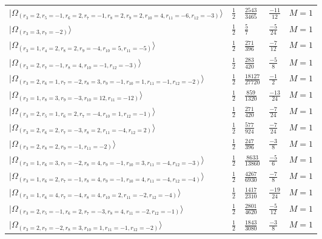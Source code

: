 \documentclass[11pt,twoside,openright]{book}
\begin{document}
\begin{longtable}{p{4cm}llll}
$|\Omega_{(r_{3}=2, r_{5}=-1, r_{6}=2, r_{7}=-1, r_{8}=2, r_{9}=2, r_{10}=4, r_{11}=-6, r_{12}=-3)}\rangle$ & $\frac{1}{2}$ & $\frac{2543}{3465}$ & $\frac{-11}{12}$ & $M=1$ \\
$|\Omega_{(r_{3}=3, r_{7}=-2)}\rangle$ & $\frac{1}{2}$ & $\frac{5}{7}$ & $\frac{-5}{24}$ & $M=1$ \\
$|\Omega_{(r_{3}=1, r_{4}=2, r_{8}=2, r_{9}=-4, r_{10}=5, r_{11}=-5)}\rangle$ & $\frac{1}{2}$ & $\frac{271}{396}$ & $\frac{-7}{12}$ & $M=1$ \\
$|\Omega_{(r_{3}=2, r_{7}=-1, r_{8}=4, r_{10}=-1, r_{12}=-3)}\rangle$ & $\frac{1}{2}$ & $\frac{283}{420}$ & $\frac{-5}{8}$ & $M=1$ \\
$|\Omega_{(r_{3}=2, r_{6}=1, r_{7}=-2, r_{8}=3, r_{9}=-1, r_{10}=1, r_{11}=-1, r_{12}=-2)}\rangle$ & $\frac{1}{2}$ & $\frac{18127}{27720}$ & $\frac{-1}{2}$ & $M=1$ \\
$|\Omega_{(r_{2}=1, r_{8}=3, r_{9}=-3, r_{10}=12, r_{11}=-12)}\rangle$ & $\frac{1}{2}$ & $\frac{859}{1320}$ & $\frac{-13}{24}$ & $M=1$ \\
$|\Omega_{(r_{3}=2, r_{5}=1, r_{6}=2, r_{7}=-4, r_{10}=1, r_{12}=-1)}\rangle$ & $\frac{1}{2}$ & $\frac{271}{420}$ & $\frac{-7}{24}$ & $M=1$ \\
$|\Omega_{(r_{3}=2, r_{6}=2, r_{7}=-3, r_{8}=2, r_{11}=-4, r_{12}=2)}\rangle$ & $\frac{1}{2}$ & $\frac{577}{924}$ & $\frac{-7}{24}$ & $M=1$ \\
$|\Omega_{(r_{3}=2, r_{8}=2, r_{9}=-1, r_{11}=-2)}\rangle$ & $\frac{1}{2}$ & $\frac{247}{396}$ & $\frac{-3}{8}$ & $M=1$ \\
$|\Omega_{(r_{3}=1, r_{6}=3, r_{7}=-2, r_{8}=4, r_{9}=-1, r_{10}=3, r_{11}=-4, r_{12}=-3)}\rangle$ & $\frac{1}{2}$ & $\frac{8633}{13860}$ & $\frac{-5}{6}$ & $M=1$ \\
$|\Omega_{(r_{3}=1, r_{6}=2, r_{7}=-1, r_{8}=4, r_{9}=-1, r_{10}=4, r_{11}=-4, r_{12}=-4)}\rangle$ & $\frac{1}{2}$ & $\frac{4267}{6930}$ & $\frac{-7}{8}$ & $M=1$ \\
$|\Omega_{(r_{3}=1, r_{6}=4, r_{7}=-4, r_{8}=4, r_{10}=2, r_{11}=-2, r_{12}=-4)}\rangle$ & $\frac{1}{2}$ & $\frac{1417}{2310}$ & $\frac{-19}{24}$ & $M=1$ \\
$|\Omega_{(r_{3}=2, r_{5}=-1, r_{6}=2, r_{7}=-3, r_{8}=4, r_{11}=-2, r_{12}=-1)}\rangle$ & $\frac{1}{2}$ & $\frac{2801}{4620}$ & $\frac{-5}{12}$ & $M=1$ \\
$|\Omega_{(r_{3}=2, r_{7}=-2, r_{8}=3, r_{10}=1, r_{11}=-1, r_{12}=-2)}\rangle$ & $\frac{1}{2}$ & $\frac{1843}{3080}$ & $\frac{-3}{8}$ & $M=1$ \\

\end{longtable}
\end{document}
